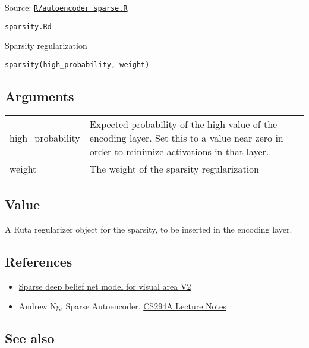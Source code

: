 Source:
\href{https://github.com/fdavidcl/ruta/blob/master/R/autoencoder_sparse.R}{\texttt{R/autoencoder\_sparse.R}}

\texttt{sparsity.Rd}

Sparsity regularization

\begin{verbatim}
sparsity(high_probability, weight)
\end{verbatim}

\hypertarget{arguments}{\subsection{\texorpdfstring{\protect\hyperlink{arguments}{}Arguments}{Arguments}}\label{arguments}}

\begin{longtable}[c]{@{}>{\small}p{3cm}>{\raggedright}p{12.5cm}@{}}
\toprule
high\_probability & Expected probability of the high value of the
encoding layer. Set this to a value near zero in order to minimize
activations in that layer.\tabularnewline
weight & The weight of the sparsity regularization\tabularnewline
\bottomrule
\end{longtable}

\hypertarget{value}{\subsection{\texorpdfstring{\protect\hyperlink{value}{}Value}{Value}}\label{value}}

A Ruta regularizer object for the sparsity, to be inserted in the
encoding layer.

\hypertarget{references}{\subsection{\texorpdfstring{\protect\hyperlink{references}{}References}{References}}\label{references}}

\begin{itemize}
\item
  \href{http://papers.nips.cc/paper/3313-sparse-deep-belief-net-model-for-visual-area-v2}{Sparse
  deep belief net model for visual area V2}
\item
  Andrew Ng, Sparse Autoencoder.
  \href{https://web.stanford.edu/class/cs294a/sparseAutoencoder_2011new.pdf}{CS294A
  Lecture Notes}
\end{itemize}

\hypertarget{see-also}{\subsection{\texorpdfstring{\protect\hyperlink{see-also}{}See
also}{See also}}\label{see-also}}

